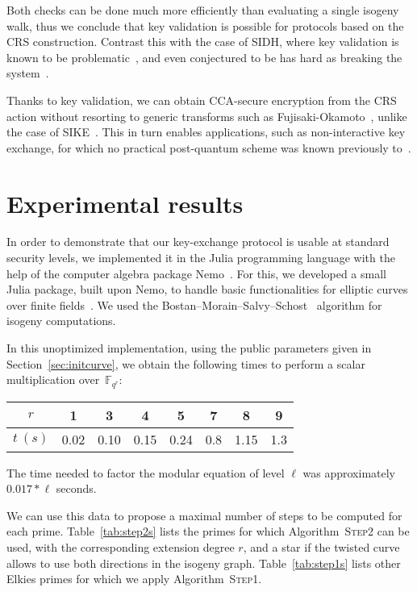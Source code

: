 \documentclass{article}
\newcommand{\F}{\mathbb{F}}
\newcommand{\algstyle}[1]{\textsc{#1}}
\theoremstyle{definition}
\begin{document}
\smallskip

Both checks can be done much more efficiently than evaluating a single
isogeny walk, thus we conclude that key validation is possible for
protocols based on the CRS construction. Contrast this with the case
of SIDH, where key validation is known to be
problematic~\cite{galbraithsecurity}, and even conjectured to be has
hard as breaking the system~\cite{cryptoeprint:2018:336}.

Thanks to key validation, we can obtain CCA-secure encryption from the
CRS action without resorting to generic transforms such as
Fujisaki-Okamoto~\cite{10.1007/3-540-48405-1_34}, unlike the case of
SIKE~\cite{SIKE,10.1007/978-3-319-70500-2_12}. This in turn enables
applications, such as non-interactive key exchange, for which no
practical post-quantum scheme was known previously to~\cite{csidh}.


\section{Experimental results}
\label{sec:exp}

In order to demonstrate that our key-exchange protocol is usable
at standard security levels, we implemented it in the Julia
programming language with the help of the computer algebra package
Nemo~\cite{todo:Nemo}. For this, we developed a small
Julia package, built upon Nemo, to handle basic functionalities
for elliptic curves over finite fields~\cite{todo:package}.
We used the Bostan--Morain--Salvy--Schost~\cite{todo:BMSS} algorithm for
isogeny computations.

In this unoptimized implementation, 
using the public parameters given in
Section~\ref{sec:initcurve},
we obtain
the following times to perform a scalar multiplication over~$\F_{q^r}$:

\begin{center}
\begin{tabular}{c|ccccccc}
$r$ & 1 & 3 & 4 & 5 & 7 & 8 & 9 \\
\hline
$t\ (s)$ & 0.02 & 0.10 & 0.15 & 0.24 & 0.8 & 1.15 & 1.3
\end{tabular}
\end{center}
The time needed to factor the modular equation of level $\ell$
was approximately $0.017 * \ell$ seconds.

We can use this data to propose a maximal number of steps to be
computed for each prime. Table~\ref{tab:step2s}
lists the primes for which Algorithm~\algstyle{Step2} can be used, with
the corresponding extension degree $r$, and a star if the twisted curve
allows to use both directions in the isogeny graph.
Table~\ref{tab:step1s}
lists other Elkies primes for which we apply Algorithm~\algstyle{Step1}.
\end{document}
